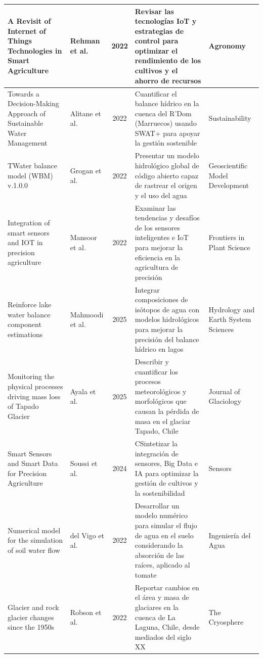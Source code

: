\documentclass[12pt]{report}
\begin{document}
\begin{longtable}{p{2.8cm} p{2.8cm} c p{4cm} p{3cm}}
A Revisit of Internet of Things Technologies in Smart Agriculture & Rehman et al. & 2022 & Revisar las tecnologías IoT y estrategias de control para optimizar el rendimiento de los cultivos y el ahorro de recursos
 & Agronomy \\ \hline

Towards a Decision-Making Approach of Sustainable Water Management & Alitane et al. & 2022 & Cuantificar el balance hídrico en la cuenca del R’Dom (Marruecos) usando SWAT+ para apoyar la gestión sostenible & Sustainability \\ \hline

TWater balance model (WBM) v.1.0.0 & Grogan et al. & 2022 & Presentar un modelo hidrológico global de código abierto capaz de rastrear el origen y el uso del agua & Geoscientific Model Development \\ \hline

Integration of smart sensors and IOT in precision agriculture& Mansoor et al. & 2022 & Examinar las tendencias y desafíos de los sensores inteligentes e IoT para mejorar la eficiencia en la agricultura de precisión & Frontiers in Plant Science \\ \hline

Reinforce lake water balance component estimations & Mahmoodi et al. & 2025 & Integrar composiciones de isótopos de agua con modelos hidrológicos para mejorar la precisión del balance hídrico en lagos & Hydrology and Earth System Sciences \\ \hline

Monitoring the physical processes driving mass loss of Tapado Glacier & Ayala et al. & 2025 & Describir y cuantificar los procesos meteorológicos y morfológicos que causan la pérdida de masa en el glaciar Tapado, Chile & Journal of Glaciology \\ \hline

Smart Sensors and Smart Data for Precision Agriculture & Soussi et al. & 2024 & CSintetizar la integración de sensores, Big Data e IA para optimizar la gestión de cultivos y la sostenibilidad & Sensors \\ \hline

Numerical model for the simulation of soil water flow & del Vigo et al. & 2022 & Desarrollar un modelo numérico para simular el flujo de agua en el suelo considerando la absorción de las raíces, aplicado al tomate & Ingeniería del Agua \\ \hline

Glacier and rock glacier changes since the 1950s & Robson et al. & 2022 & Reportar cambios en el área y masa de glaciares en la cuenca de La Laguna, Chile, desde mediados del siglo XX & The Cryosphere \\ \hline  


\end{longtable}
\end{document}
